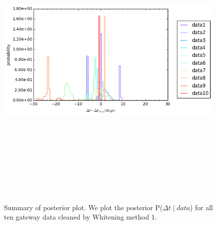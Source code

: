 \documentclass[\docopts]{\docclass}
\begin{document}
\begin{figure}[!h]
\includegraphics[width=\textwidth, height=15cm, keepaspectratio]{summary_posterior_summary.png}
\caption{Summary of posterior plot. We plot the posterior P($\Delta t \mid data$) for all ten gateway data cleaned by Whitening method 1.}
\label{fig:summary_post}
\end{figure}
\end{document}
